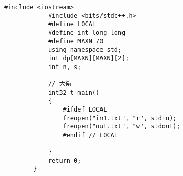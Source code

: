 \documentclass[10pt]{article}
\begin{document}
	\begin{CJK}{UTF8}{bsmi}
		\begin{lstlisting}[style=cpp]
			#include <iostream>
			#include <bits/stdc++.h>
			#define LOCAL
			#define int long long
			#define MAXN 70
			using namespace std;
			int dp[MAXN][MAXN][2];
			int n, s;
			
			// 大衛
			int32_t main()
			{
				#ifdef LOCAL
				freopen("in1.txt", "r", stdin);
				freopen("out.txt", "w", stdout);
				#endif // LOCAL
				
			}
			return 0;
		}
	\end{lstlisting}
	
\end{CJK}
\end{document}
